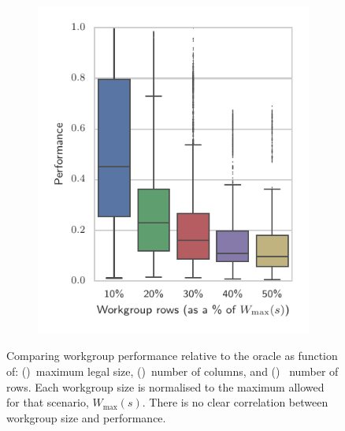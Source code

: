 \documentclass[nonatbib,preprint,9pt]{sigplanconf}
\begin{document}
\begin{figure}
\begin{subfigure}[h]{.48\columnwidth}
    \vspace{-1.5em} %
    \caption{}
    \label{fig:performance-wg-c}
  \end{subfigure}
  ~%
  \begin{subfigure}[h]{.48\columnwidth}
    \centering
    \includegraphics[width=\columnwidth]{img/performance_max_r}
    \vspace{-1.5em} %
    \caption{}
    \label{fig:performance-wg-r}
  \end{subfigure}
  \caption{%
    Comparing workgroup performance relative to the oracle as function
    of: ()~maximum legal size,
    ()~number of columns, and
    ()~ number of rows. Each workgroup
    size is normalised to the maximum allowed for that scenario,
    $W_{\max}(s)$. There is no clear correlation between workgroup
    size and performance.%
  }
  \label{fig:performance-wgsizes}
\end{figure}
\end{document}
